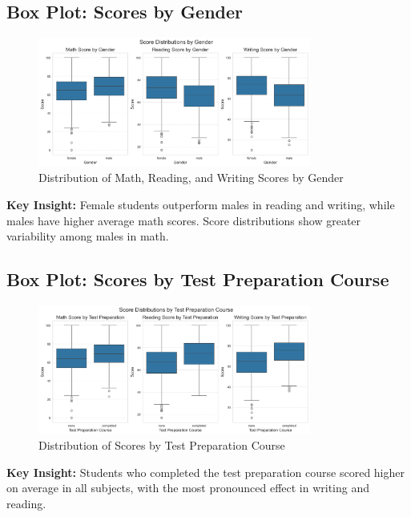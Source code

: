 \documentclass[12pt]{article}
\begin{document}
\subsection{Box Plot: Scores by Gender}
\begin{figure}[H]
    \centering
    \includegraphics[width=0.8\textwidth]{figures/boxplot_scores_by_gender.png}
    \caption{Distribution of Math, Reading, and Writing Scores by Gender}
\end{figure}
\textbf{Key Insight:} Female students outperform males in reading and writing, while males have higher average math scores. Score distributions show greater variability among males in math.

\subsection{Box Plot: Scores by Test Preparation Course}
\begin{figure}[H]
    \centering
    \includegraphics[width=0.8\textwidth]{figures/boxplot_scores_by_testprep.png}
    \caption{Distribution of Scores by Test Preparation Course}
\end{figure}
\textbf{Key Insight:} Students who completed the test preparation course scored higher on average in all subjects, with the most pronounced effect in writing and reading.
\end{document}

